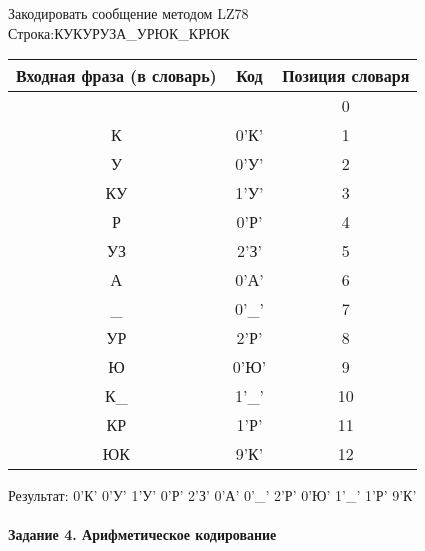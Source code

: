 \documentclass[a4paper, 12pt]{article}
\begin{document}
Закодировать сообщение методом LZ78\\
Строка:КУКУРУЗА\_УРЮК\_КРЮК\\
\begin{table}[h!]
\centering
\begin{tabular}{|c|c|c|} 
\hline
 Входная фраза (в словарь) & Код & Позиция словаря \\ \hline

 &  & 0 \\ \hline
К & 0'К' & 1 \\ \hline
У & 0'У' & 2 \\ \hline
КУ & 1'У' & 3 \\ \hline
Р & 0'Р' & 4 \\ \hline
УЗ & 2'З' & 5 \\ \hline
А & 0'А' & 6 \\ \hline
\_ & 0'\_' & 7 \\ \hline
УР & 2'Р' & 8 \\ \hline
Ю & 0'Ю' & 9 \\ \hline
К\_ & 1'\_' & 10 \\ \hline
КР & 1'Р' & 11 \\ \hline
ЮК & 9'К' & 12 \\ \hline
\end{tabular}
\end{table}

Результат: 0'К' 0'У' 1'У' 0'Р' 2'З' 0'А' 0'\_' 2'Р' 0'Ю' 1'\_' 1'Р' 9'К'\\
\pagebreak
\paragraph{Задание 4. Арифметическое кодирование\\}
\end{document}
